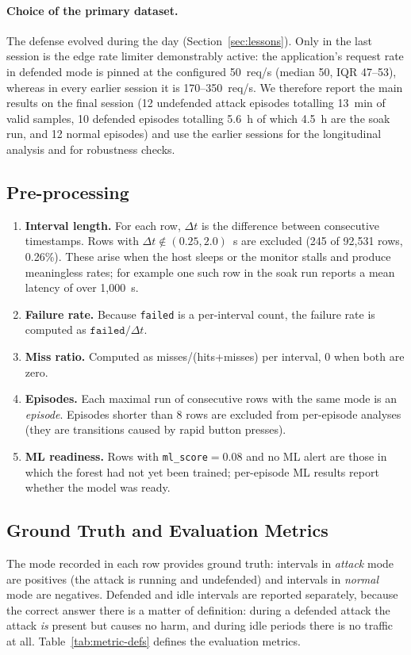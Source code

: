 \documentclass[preprint,12pt]{elsarticle}
\begin{document}
\paragraph{Choice of the primary dataset.} The defense evolved during the day
(Section~\ref{sec:lessons}). Only in the last session is the edge rate limiter
demonstrably active: the application's request rate in defended mode is pinned at the
configured 50~req/s (median 50, IQR 47--53), whereas in every earlier session it is
170--350~req/s. We therefore report the main results on the final session (12
undefended attack episodes totalling 13~min of valid samples, 10 defended episodes
totalling 5.6~h of which 4.5~h are the soak run, and 12 normal episodes) and use the earlier sessions for the longitudinal
analysis and for robustness checks.

\subsection{Pre-processing}
\begin{enumerate}[leftmargin=*]
\item \textbf{Interval length.} For each row, $\Delta t$ is the difference between
consecutive timestamps. Rows with $\Delta t\notin(0.25, 2.0)$~s are excluded (245 of
92{,}531 rows, 0.26\%). These arise when the host sleeps or the monitor stalls and produce
meaningless rates; for example one such row in the soak run reports a mean latency of
over 1{,}000~s.
\item \textbf{Failure rate.} Because \texttt{failed} is a per-interval count, the
failure rate is computed as $\texttt{failed}/\Delta t$.
\item \textbf{Miss ratio.} Computed as misses/(hits+misses) per interval, 0 when both
are zero.
\item \textbf{Episodes.} Each maximal run of consecutive rows with the same mode is an
\emph{episode}. Episodes shorter than 8 rows are excluded from per-episode analyses
(they are transitions caused by rapid button presses).
\item \textbf{ML readiness.} Rows with \texttt{ml\_score}$=0.08$ and no ML alert are
those in which the forest had not yet been trained; per-episode ML results report
whether the model was ready.
\end{enumerate}

\subsection{Ground Truth and Evaluation Metrics}
The mode recorded in each row provides ground truth: intervals in \emph{attack} mode
are positives (the attack is running and undefended) and intervals in \emph{normal}
mode are negatives. Defended and idle intervals are reported separately, because the
correct answer there is a matter of definition: during a defended attack the attack
\emph{is} present but causes no harm, and during idle periods there is no traffic at
all. Table~\ref{tab:metric-defs} defines the evaluation metrics.
\end{document}
